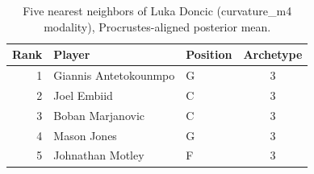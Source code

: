 \begin{table}[htbp]
  \centering\small
  \begin{tabular}{rllc}
    \toprule
    Rank & Player & Position & Archetype \\
    \midrule
    1 & Giannis Antetokounmpo & G & 3 \\
    2 & Joel Embiid & C & 3 \\
    3 & Boban Marjanovic & C & 3 \\
    4 & Mason Jones & G & 3 \\
    5 & Johnathan Motley & F & 3 \\
    \bottomrule
  \end{tabular}
  \caption{Five nearest neighbors of Luka Doncic (curvature_m4 modality), Procrustes-aligned posterior mean.}
  \label{tab:Luka_Doncic_neighbors_curvature_m4}
\end{table}

